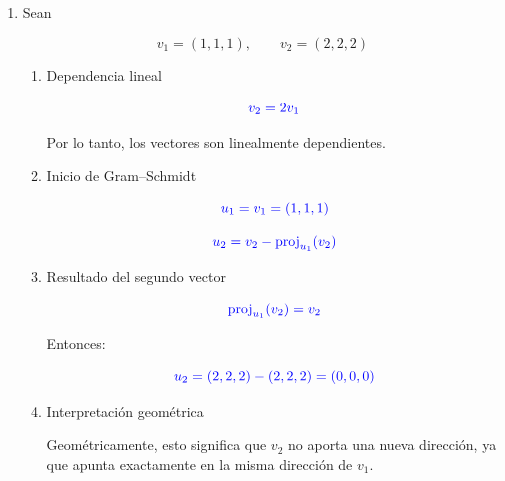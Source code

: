 \documentclass[12pt,letterpaper]{article}
\newcommand{\respuesta}[1]{
\[
\textcolor{blue}{#1}
\]
}
\begin{document}
\begin{enumerate}[label=\textbf{\arabic*.}]
\begin{enumerate}[label=\alph*)]
\respuesta{
\operatorname{proj}_{u_1}(v_3)
=
\left(
\frac12,
\frac12,
0
\right)
}

\respuesta{
\operatorname{proj}_{u_2}(v_3)
=
\left(
-\frac13,
\frac13,
-\frac23
\right)
}

\respuesta{
u_3=
\left(
-\frac16,
\frac16,
\frac53
\right)
}

\item Verificación de ortogonalidad

\respuesta{
u_1\cdot u_2=0
}

\respuesta{
u_1\cdot u_3=0
}

\respuesta{
u_2\cdot u_3=0
}

\item Normalización de \(u_1\)

\respuesta{
\|u_1\|=\sqrt2
}

\respuesta{
e_1=
\left(
\frac1{\sqrt2},
\frac1{\sqrt2},
0
\right)
}

\end{enumerate}

\vspace{0.5cm}


\item Sean

\[
v_1=(1,1,1),
\qquad
v_2=(2,2,2)
\]

\begin{enumerate}[label=\alph*)]

\item Dependencia lineal

\respuesta{
v_2=2v_1
}

Por lo tanto, los vectores son linealmente dependientes.

\item Inicio de Gram--Schmidt

\respuesta{
u_1=v_1=(1,1,1)
}

\respuesta{
u_2=v_2-\operatorname{proj}_{u_1}(v_2)
}

\item Resultado del segundo vector

\respuesta{
\operatorname{proj}_{u_1}(v_2)=v_2
}

Entonces:

\respuesta{
u_2=(2,2,2)-(2,2,2)=(0,0,0)
}

\item Interpretación geométrica

Geométricamente, esto significa que \(v_2\) no aporta una nueva dirección, ya que apunta exactamente en la misma dirección de \(v_1\).

\end{enumerate}

\end{enumerate}
\end{document}
